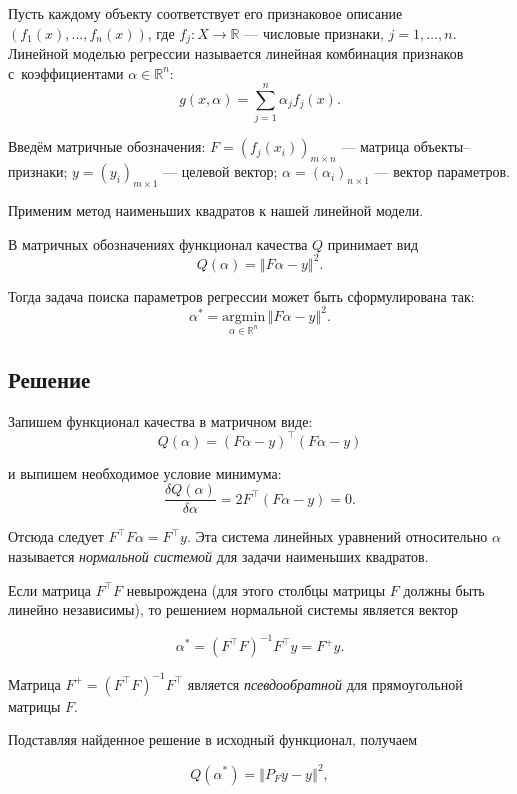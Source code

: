 \documentclass[11pt,a4paper]{article}
\begin{document}
Пусть каждому объекту соответствует его признаковое описание \(\left( f_1(x), \ldots, f_n(x)\right)\), где \(f_j: X \rightarrow \mathbb{R}\) --- числовые признаки, \(j = 1, \ldots , n\).
Линейной моделью регрессии называется линейная комбинация признаков с~коэффициентами \(\alpha \in \mathbb{R}^n\): \[ g(x, \alpha) = \sum_{j=1}^n \alpha_j f_j(x). \]

Введём матричные обозначения:
\(F = \left( f_j(x_i) \right)_{m \times n}\) --- матрица
объекты--признаки; \(y = \left( y_i \right)_{m \times 1}\) --- целевой
вектор; \(\alpha = \left( \alpha_i \right)_{n \times 1}\) --- вектор
параметров.

Применим метод наименьших квадратов к нашей линейной модели.

В матричных обозначениях функционал качества \(Q\) принимает вид
\[ Q(\alpha) = \left\Vert F\alpha - y \right\Vert^2. \]

Тогда задача поиска параметров регрессии может быть сформулирована так:
\[ \alpha^* = \underset{\alpha \in \mathbb{R}^n}{\text{argmin}} \, {\left\Vert F\alpha - y \right\Vert^2}. \]

    \hypertarget{ux440ux435ux448ux435ux43dux438ux435}{%
\subsection{Решение}\label{ux440ux435ux448ux435ux43dux438ux435}}

Запишем функционал качества в матричном виде:
\[ Q(\alpha) = (F\alpha - y)^\top (F\alpha - y) \]

и выпишем необходимое условие минимума:
\[ \frac{\delta Q(\alpha)}{\delta \alpha} = 2F^\top (F\alpha - y) = 0. \]

Отсюда следует \(F^{\top} F \alpha = F^{\top}y\). Эта система линейных
уравнений относительно \(\alpha\) называется \emph{нормальной системой}
для задачи наименьших квадратов.

Если матрица \(F^{\top} F\) невырождена (для этого столбцы матрицы \(F\)
должны быть линейно независимы), то решением нормальной системы является
вектор

\[ \alpha^* = (F^{\top} F)^{-1} F^{\top} y = F^{+} y. \]

Матрица \(F^{+} = (F^{\top} F)^{-1} F^{\top}\) является
\emph{псевдообратной} для прямоугольной матрицы \(F\).

Подставляя найденное решение в исходный функционал, получаем

\[ Q(\alpha^*) = \left\Vert P_Fy - y \right\Vert^2, \]
\end{document}

